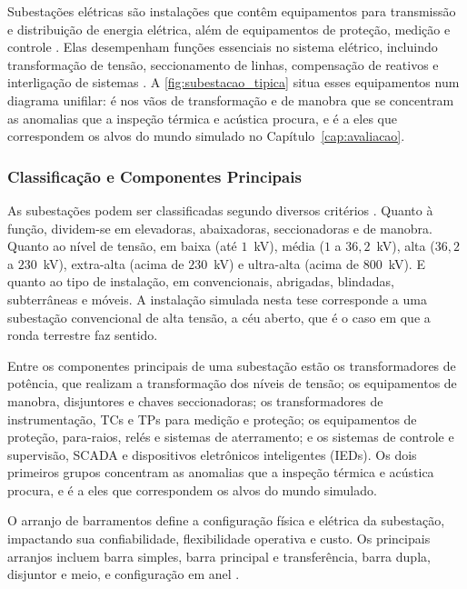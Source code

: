 Subestações elétricas são instalações que contêm equipamentos para transmissão e distribuição de energia elétrica, além de equipamentos de proteção, medição e controle \cite{Muzy2012}. Elas desempenham funções essenciais no sistema elétrico, incluindo transformação de tensão, seccionamento de linhas, compensação de reativos e interligação de sistemas \cite{Kindermann2012}. A \autoref{fig:subestacao_tipica} situa esses equipamentos num diagrama unifilar: é nos vãos de transformação e de manobra que se concentram as anomalias que a inspeção térmica e acústica procura, e é a eles que correspondem os alvos do mundo simulado no Capítulo~\ref{cap:avaliacao}.

\subsubsection{Classificação e Componentes Principais}

As subestações podem ser classificadas segundo diversos critérios \cite{Mamede2017}.
Quanto à função, dividem-se em elevadoras, abaixadoras, seccionadoras e de manobra.
Quanto ao nível de tensão, em baixa (até $1$~kV), média ($1$ a $36{,}2$~kV), alta
($36{,}2$ a $230$~kV), extra-alta (acima de $230$~kV) e ultra-alta (acima de $800$~kV).
E quanto ao tipo de instalação, em convencionais, abrigadas, blindadas, subterrâneas e
móveis. A instalação simulada nesta tese corresponde a uma subestação convencional de
alta tensão, a céu aberto, que é o caso em que a ronda terrestre faz sentido.

Entre os componentes principais de uma subestação \cite{Frontin2013} estão os
transformadores de potência, que realizam a transformação dos níveis de tensão; os
equipamentos de manobra, disjuntores e chaves seccionadoras; os transformadores de
instrumentação, TCs e TPs para medição e proteção; os equipamentos de proteção,
para-raios, relés e sistemas de aterramento; e os sistemas de controle e supervisão,
SCADA e dispositivos eletrônicos inteligentes (IEDs). Os dois primeiros grupos concentram
as anomalias que a inspeção térmica e acústica procura, e é a eles que correspondem os
alvos do mundo simulado.

O arranjo de barramentos define a configuração física e elétrica da subestação, impactando sua confiabilidade, flexibilidade operativa e custo. Os principais arranjos incluem barra simples, barra principal e transferência, barra dupla, disjuntor e meio, e configuração em anel \cite{Frontin2013}.

